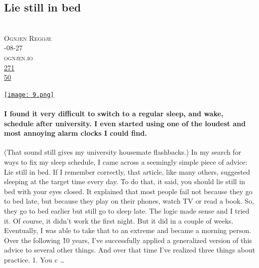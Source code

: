 \documentclass[10pt,a4paper]{article}
\begin{document}
\subsection{Lie still in bed}
\noindent\begin{minipage}[t]{0.19\linewidth}
\vspace{0pt}
\noindent\scshape\footnotesize
\\ {\scriptsize\faUser}\space 
Ognjen Regoje
\\ {\scriptsize\faCalendar}-08-27
\\ {\scriptsize\faGlobe}\space 
ognjen.io
\\ {\scriptsize\faThumbsOUp}\space 
\href{http://news.ycombinator.com/item?id=37281060\&utm\_term=comment}{271} 
\\ {\scriptsize\faComments}\space 
\href{http://news.ycombinator.com/item?id=37281060\&utm\_term=comment}{50} 
\end{minipage} 
\begin{minipage}[t]{0.80\linewidth}
\vspace{0pt}
\begin{multicols}{2}
    \href{https://ognjen.io/lie-still-in-bed/?utm\_source=hackernewsletter\&utm\_medium=email\&utm\_term=fav}{
        \texttt{[image: 9.png]}
    }
\paragraph{I found it very difficult to switch to a regular sleep, and wake, schedule after university.
I even started using one of the loudest and most annoying alarm clocks I could find.}
 (That sound still gives my university housemate flashbacks.)
In my search for ways to fix my sleep schedule, I came across a seemingly simple piece of advice:
Lie still in bed.
If I remember correctly, that article, like many others, suggested sleeping at the target time every day. To do that, it said, you should lie still in bed with your eyes closed.
It explained that most people fail not because they go to bed late, but because they play on their phones, watch TV or read a book. So, they go to bed earlier but still go to sleep late.
The logic made sense and I tried it. Of course, it didn’t work the first night. But it did in a couple of weeks.
Eventually, I was able to take that to an extreme and became a morning person.
Over the following \~10 years, I’ve successfully applied a generalized version of this advice to several other things.
And over that time I’ve realized three things about practice.
1. You c
\dots
\end{multicols}
\end{minipage}
\par\medskip
\end{document}
